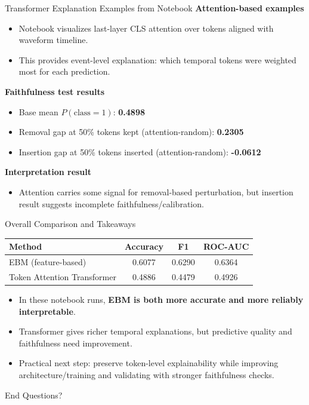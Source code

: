 \documentclass[aspectratio=169]{beamer}
\begin{document}
\begin{frame}{Transformer Explanation Examples from Notebook}
\textbf{Attention-based examples}
\begin{itemize}
  \item Notebook visualizes last-layer CLS attention over tokens aligned with waveform timeline.
  \item This provides event-level explanation: which temporal tokens were weighted most for each prediction.
\end{itemize}

\textbf{Faithfulness test results}
\begin{itemize}
  \item Base mean $P(\text{class}=1)$: \textbf{0.4898}
  \item Removal gap at 50\% tokens kept (attention-random): \textbf{0.2305}
  \item Insertion gap at 50\% tokens inserted (attention-random): \textbf{-0.0612}
\end{itemize}

\textbf{Interpretation result}
\begin{itemize}
  \item Attention carries some signal for removal-based perturbation, but insertion result suggests incomplete faithfulness/calibration.
\end{itemize}
\end{frame}

\begin{frame}{Overall Comparison and Takeaways}
\begin{table}
\centering
\begin{tabular}{lccc}
\toprule
Method & Accuracy & F1 & ROC-AUC \\
\midrule
EBM (feature-based) & 0.6077 & 0.6290 & 0.6364 \\
Token Attention Transformer & 0.4886 & 0.4479 & 0.4926 \\
\bottomrule
\end{tabular}
\end{table}

\vspace{0.4cm}
\begin{itemize}
  \item In these notebook runs, \textbf{EBM is both more accurate and more reliably interpretable}.
  \item Transformer gives richer temporal explanations, but predictive quality and faithfulness need improvement.
  \item Practical next step: preserve token-level explainability while improving architecture/training and validating with stronger faithfulness checks.
\end{itemize}
\end{frame}

\begin{frame}{End}
\centering
\Large Questions?
\end{frame}
\end{document}
